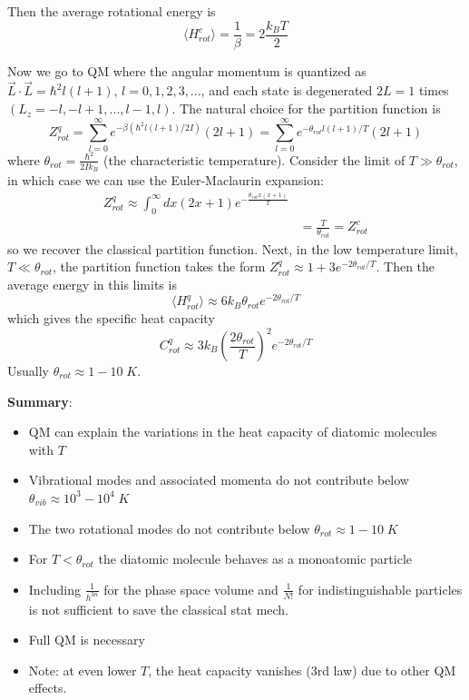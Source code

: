 \documentclass[12pt, a4paper, oneside, openright, titlepage]{book}
\begin{document}
Then the average rotational energy is \begin{equation*}
    \langle H_{rot}^c\rangle = \frac{1}{\beta} = 2\frac{k_BT}{2}
\end{equation*}

Now we go to QM where the angular momentum is quantized as $\vec{L}\cdot\vec{L} = \hbar^2l(l+1)$, $l = 0,1,2,3,...$, and each state is degenerated $2L=1$ times $(L_z = -l,-l+1,...,l-1,l)$. The natural choice for the partition function is \begin{equation*}
    Z_{rot}^q = \sum_{l=0}^{\infty}e^{-\beta(\hbar^2l(l+1)/2I)}(2l+1) = \sum_{l=0}^{\infty}e^{-\theta_{rot}l(l+1)/T}(2l+1)
\end{equation*}
where $\theta_{rot} = \frac{\hbar^2}{2Ik_B}$ (the characteristic temperature). Consider the limit of $T \gg \theta_{rot}$, in which case we can use the Euler-Maclaurin expansion: \begin{align*}
    Z_{rot}^q \approx \int_0^{\infty}dx(2x+1)e^{-\frac{\theta_{rot}x(x+1)}{T}} \\
    &= \frac{T}{\theta_{rot}} = Z_{rot}^c
\end{align*}
so we recover the classical partition function. Next, in the low temperature limit, $T\ll \theta_{rot}$, the partition function takes the form $Z_{rot}^q \approx 1 + 3e^{-2\theta_{rot}/T}$. Then the average energy in this limits is \begin{equation*}
    \langle H_{rot}^q\rangle \approx 6k_B\theta_{rot}e^{-2\theta_{rot}/T}
\end{equation*}
which gives the specific heat capacity \begin{equation*}
    C_{rot}^q \approx 3k_B\left(\frac{2\theta_{rot}}{T}\right)^2e^{-2\theta_{rot}/T}
\end{equation*}
Usually $\theta_{rot}\approx 1-10\;K$.

\textbf{Summary}: \begin{itemize}
    \item QM can explain the variations in the heat capacity of diatomic molecules with $T$
    \item Vibrational modes and associated momenta do not contribute below $\theta_{vib} \approx 10^3-10^4\;K$
    \item The two rotational modes do not contribute below $\theta_{rot} \approx 1-10\;K$
    \item For $T <\theta_{rot}$ the diatomic molecule behaves as a monoatomic particle
    \item Including $\frac{1}{h^{3n}}$ for the phase space volume and $\frac{1}{N!}$ for indistinguishable particles is not sufficient to save the classical stat mech.
    \item Full QM is necessary
    \item Note: at even lower $T$, the heat capacity vanishes (3rd law) due to other QM effects.
\end{itemize}
\end{document}
